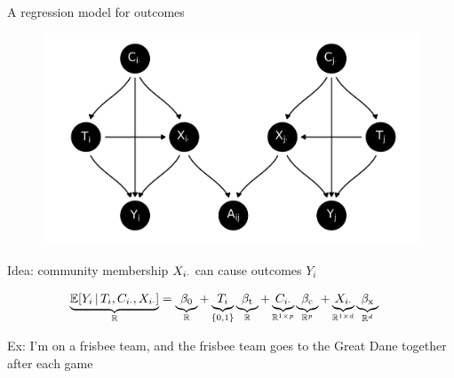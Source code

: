 \documentclass{beamer}
\theoremstyle{remark}
\begin{document}
\begin{frame}{A regression model for outcomes}

    \centering

    \begin{figure}
        \includegraphics[scale=0.35]{figures/dags/mediating-5.png}
        \label{fig:mediating-5-again}
    \end{figure}

    Idea: community membership $X_{i \cdot}$ can cause outcomes $Y_i$

    \begin{align*}
        \underbrace{\E[T_i, \C_{i \cdot}, \X_{i \cdot}]{Y_i}}_{\R}
         & = \underbrace{\betazero}_{\R}
        + \underbrace{T_i}_{\{0, 1\}} \underbrace{\betat}_{\R}
        + \underbrace{\C_{i \cdot}}_{\R^{1 \times p}} \underbrace{\betac}_{\R^{p}}
        + \underbrace{\X_{i \cdot}}_{\R^{1 \times d}} \underbrace{\betax}_{\R^d}
    \end{align*}

    Ex: I'm on a frisbee team, and the frisbee team goes to the Great Dane together after each game

\end{frame}
\end{document}
